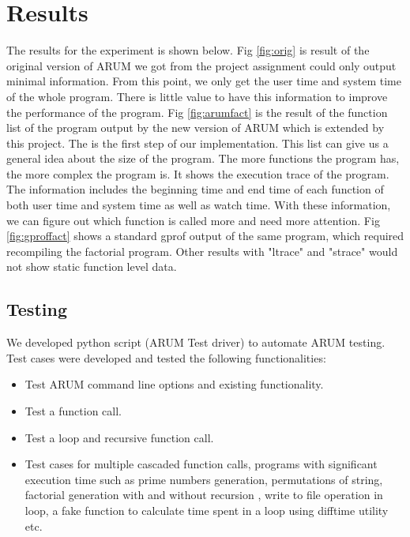 \documentclass[11pt,letterpaper,oneside]{article}
\begin{document}
\section{Results}
\label{sec:resultsa}

The results for the experiment is shown below.   Fig \ref{fig:orig} is result of the original version of ARUM we got from the project assignment could only output minimal information. From this point, we only get the user time and system time of the whole program. There is little value to have this information to improve the performance of the program. Fig \ref{fig:arumfact} is the result of the function list of the program output by the new version of ARUM which is extended by this project. The is the first step of our implementation. This list can give us a general idea about the size of the program. The more functions the program has, the more complex the program is. It shows the execution trace of the program. The information includes the beginning time and end time of each function of both user time and system time as well as watch time. With these information, we can figure out which function is called more and need more attention.  Fig \ref{fig:gproffact} shows a standard gprof output of the same program, which required recompiling the factorial program.   Other results with "ltrace" and "strace" would not show static function level data.

\subsection{Testing}

We developed python script (ARUM Test driver) to automate ARUM testing. Test cases were developed and tested the following functionalities:
\begin{itemize}
\item Test ARUM command line options and existing functionality.
\item Test a function call.
\item Test a loop and recursive function call.
\item Test cases for multiple cascaded function calls, programs with significant execution time such as prime numbers generation, permutations of string, factorial generation with and without recursion , write to file operation in loop,  a fake function to calculate time spent in a loop using difftime utility etc. 
\end{itemize}
\end{document}
